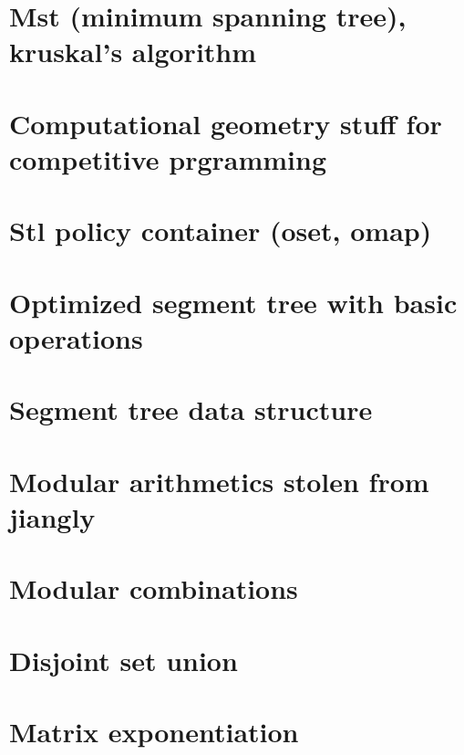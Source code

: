 \section{Mst (minimum spanning tree), kruskal's algorithm}
\raggedbottom

\section{Computational geometry stuff for competitive prgramming}
\raggedbottom

\section{Stl policy container (oset, omap)}
\raggedbottom

\section{Optimized segment tree with basic operations}
\raggedbottom

\section{Segment tree data structure}
\raggedbottom

\section{Modular arithmetics stolen from jiangly}
\raggedbottom

\section{Modular combinations}
\raggedbottom

\section{Disjoint set union}
\raggedbottom

\section{Matrix exponentiation}
\raggedbottom

